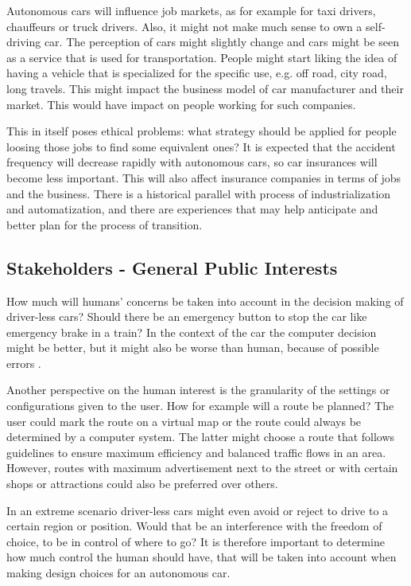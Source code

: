 Autonomous cars will influence job markets, as for example for taxi drivers, chauffeurs or truck drivers. Also, it might not make much sense to own a self-driving car. The perception of cars might slightly change and cars might be seen as a service that is used for transportation. People might start liking the idea of having a vehicle that is specialized for the specific use, e.g. off road, city road, long travels. This might impact the business model of car manufacturer and their market. This would have impact on people working for such companies.

This in itself poses ethical problems: what strategy should be applied for people loosing those jobs to find some equivalent ones? It is expected that the accident frequency will decrease rapidly with autonomous cars, so car insurances will become less important. This will also affect insurance companies in terms of jobs and the business. There is a historical parallel with process of industrialization and automatization, and there are experiences that may help anticipate and better plan for the process of transition.


\subsection{Stakeholders - General Public Interests}
\label{sec:EAofNONTC:Stakeholders}

How much will humans’ concerns be taken into account in the decision making of driver-less cars? Should there be an emergency button to stop the car like emergency brake in a train? In the context of the car the computer decision might be better, but it might also be worse than human, because of possible errors \cite{Eckstein2016}.

Another perspective on the human interest is the granularity of the settings or configurations given to the user. How for example will a route be planned? The user could mark the route on a virtual map or the route could always be determined by a computer system. The latter might choose a route that follows guidelines to ensure maximum efficiency and balanced traffic flows in an area. However, routes with maximum advertisement next to the street or with certain shops or attractions could also be preferred over others. 

In an extreme scenario driver-less cars might even avoid or reject to drive to a certain region or position. Would that be an interference with the freedom of choice, to be in control of where to go? It is therefore important to determine how much control the human should have, that will be taken into account when making design choices for an autonomous car. 


